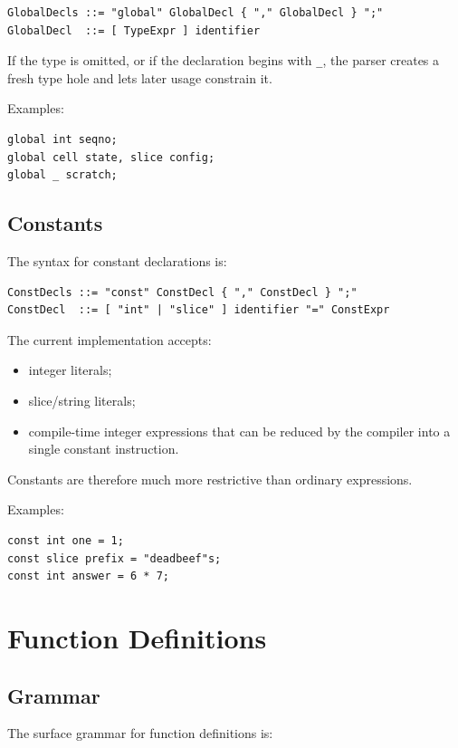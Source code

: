 \documentclass[12pt,oneside]{article}
\begin{document}
\begin{verbatim}
GlobalDecls ::= "global" GlobalDecl { "," GlobalDecl } ";"
GlobalDecl  ::= [ TypeExpr ] identifier
\end{verbatim}

If the type is omitted, or if the declaration begins with \verb|_|, the parser
creates a fresh type hole and lets later usage constrain it.

Examples:

\begin{verbatim}
global int seqno;
global cell state, slice config;
global _ scratch;
\end{verbatim}

\subsection{Constants}
The syntax for constant declarations is:

\begin{verbatim}
ConstDecls ::= "const" ConstDecl { "," ConstDecl } ";"
ConstDecl  ::= [ "int" | "slice" ] identifier "=" ConstExpr
\end{verbatim}

The current implementation accepts:

\begin{itemize}
\item integer literals;
\item slice/string literals;
\item compile-time integer expressions that can be reduced by the compiler into
a single constant instruction.
\end{itemize}

Constants are therefore much more restrictive than ordinary expressions.

Examples:

\begin{verbatim}
const int one = 1;
const slice prefix = "deadbeef"s;
const int answer = 6 * 7;
\end{verbatim}

\section{Function Definitions}
\label{sec:function-defs}
\subsection{Grammar}
The surface grammar for function definitions is:
\end{document}
